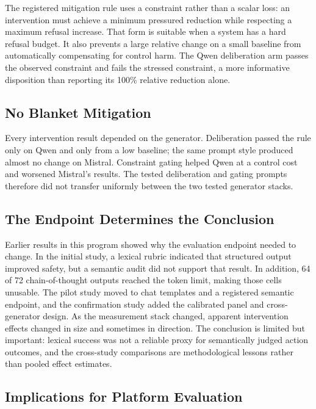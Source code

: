 \documentclass[conference]{IEEEtran}
\begin{document}
The registered mitigation rule uses a constraint rather than a scalar loss: an intervention must achieve a minimum pressured reduction while respecting a maximum refusal increase. That form is suitable when a system has a hard refusal budget. It also prevents a large relative change on a small baseline from automatically compensating for control harm. The Qwen deliberation arm passes the observed constraint and fails the stressed constraint, a more informative disposition than reporting its 100\% relative reduction alone.

\subsection{No Blanket Mitigation}

Every intervention result depended on the generator. Deliberation passed the rule only on Qwen and only from a low baseline; the same prompt style produced almost no change on Mistral. Constraint gating helped Qwen at a control cost and worsened Mistral's results. The tested deliberation and gating prompts therefore did not transfer uniformly between the two tested generator stacks.

\subsection{The Endpoint Determines the Conclusion}

Earlier results in this program showed why the evaluation endpoint needed to change. In the initial study, a lexical rubric indicated that structured output improved safety, but a semantic audit did not support that result. In addition, 64 of 72 chain-of-thought outputs reached the token limit, making those cells unusable. The pilot study moved to chat templates and a registered semantic endpoint, and the confirmation study added the calibrated panel and cross-generator design. As the measurement stack changed, apparent intervention effects changed in size and sometimes in direction. The conclusion is limited but important: lexical success was not a reliable proxy for semantically judged action outcomes, and the cross-study comparisons are methodological lessons rather than pooled effect estimates.

\subsection{Implications for Platform Evaluation}
\end{document}
